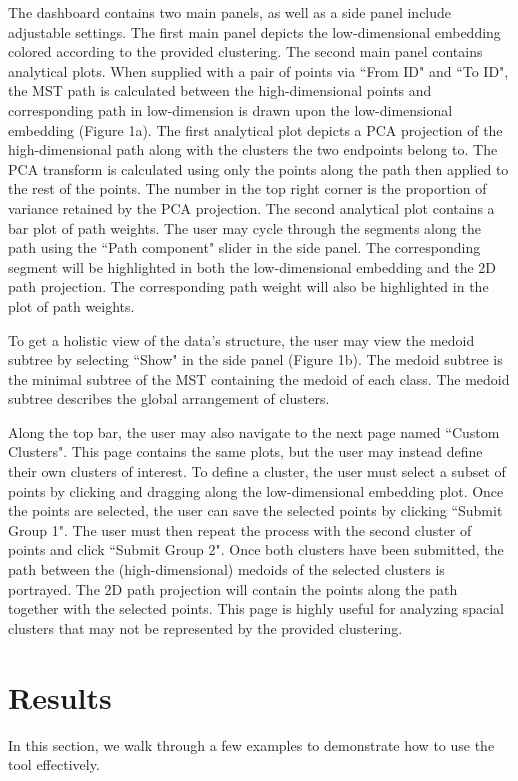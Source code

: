 \documentclass{article}
\begin{document}
The dashboard contains two main panels, as well as a side panel include adjustable settings. The first main panel depicts the low-dimensional embedding colored according to the provided clustering. The second main panel contains analytical plots. When supplied with a pair of points via ``From ID" and ``To ID", the MST path is calculated between the high-dimensional points and corresponding path in low-dimension is drawn upon the low-dimensional embedding (Figure 1a). The first analytical plot depicts a PCA projection of the high-dimensional path along with the clusters the two endpoints belong to. The PCA transform is calculated using only the points along the path then applied to the rest of the points. The number in the top right corner is the proportion of variance retained by the PCA projection. The second analytical plot contains a bar plot of path weights. The user may cycle through the segments along the path using the ``Path component" slider in the side panel. The corresponding segment will be highlighted in both the low-dimensional embedding and the 2D path projection. The corresponding path weight will also be highlighted in the plot of path weights.

To get a holistic view of the data's structure, the user may view the medoid subtree by selecting ``Show" in the side panel (Figure 1b). The medoid subtree is the minimal subtree of the MST containing the medoid of each class. The medoid subtree describes the global arrangement of clusters.

Along the top bar, the user may also navigate to the next page named ``Custom Clusters". This page contains the same plots, but the user may instead define their own clusters of interest. To define a cluster, the user must select a subset of points by clicking and dragging along the low-dimensional embedding plot. Once the points are selected, the user can save the selected points by clicking ``Submit Group 1". The user must then repeat the process with the second cluster of points and click ``Submit Group 2". Once both clusters have been submitted, the path between the (high-dimensional) medoids of the selected clusters is portrayed. The 2D path projection will contain the points along the path together with the selected points. This page is highly useful for analyzing spacial clusters that may not be represented by the provided clustering.

\section{Results}
In this section, we walk through a few examples to demonstrate how to use the tool effectively.
\end{document}
